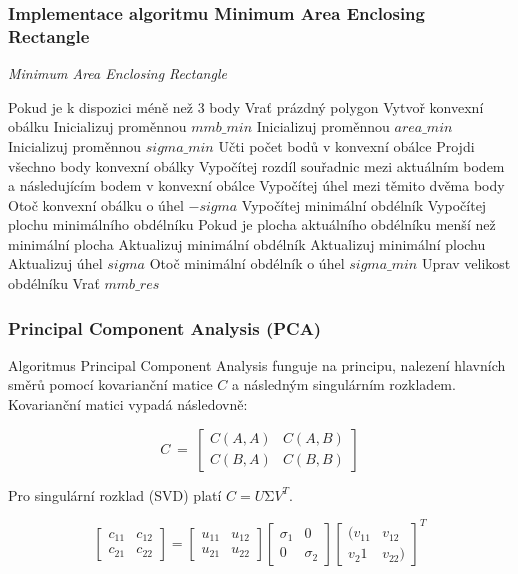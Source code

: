 \documentclass{article}
\begin{document}
\begin{spacing}{1.5}
\newpage
\subsubsection*{Implementace algoritmu Minimum Area Enclosing Rectangle}
\begin{algorithm}[h]
    \caption {\textit{Minimum Area Enclosing Rectangle}}
    \begin{algorithmic}[1]
        \State Pokud je k dispozici méně než 3 body
        \State \indent Vrať prázdný polygon
        \State Vytvoř konvexní obálku
        \State Inicializuj proměnnou $mmb\_min$ 
        \State Inicializuj proměnnou $area\_min$
        \State Inicializuj proměnnou $sigma\_min$
        \State Učti počet bodů v konvexní obálce
        \State Projdi všechno body konvexní obálky
        \State \indent Vypočítej rozdíl souřadnic mezi aktuálním bodem a následujícím bodem v konvexní obálce
        \State \indent Vypočítej úhel mezi těmito dvěma body
        \State \indent Otoč konvexní obálku o úhel $-sigma$
        \State \indent Vypočítej minimální obdélník
        \State \indent Vypočítej plochu minimálního obdélníku
        \State \indent Pokud je plocha aktuálního obdélníku menší než minimální plocha
        \State \indent \indent Aktualizuj minimální obdélník
        \State \indent \indent Aktualizuj minimální plochu  
        \State \indent \indent Aktualizuj úhel $sigma$	
        \State Otoč minimální obdélník o úhel $sigma\_min$
        \State  Uprav velikost obdélníku 
        \State Vrať $mmb\_res$
    \end{algorithmic}
\end{algorithm}

\subsubsection{Principal Component Analysis (PCA)}
Algoritmus Principal Component Analysis funguje na principu, nalezení hlavních směrů pomocí kovarianční matice $C$ a následným singulárním rozkladem. Kovarianční matici vypadá následovně:

$$C\ =\ \begin{bmatrix}
        C(A, A)&C(A, B)\\
        C(B, A)&C(B,B)
        \end{bmatrix}$$

Pro singulární rozklad (SVD) platí $C = U\mathrm{\Sigma}V^T$.

$$\begin{bmatrix}
c_{11}&c_{12}\\c_{21}&c_{22}
\end{bmatrix}
= 
\begin{bmatrix}
u_{11}&u_{12}\\u_{21}&u_{22}
\end{bmatrix}
\begin{bmatrix}
\sigma_1&0\\0&\sigma_2
\end{bmatrix}
\begin{bmatrix}
(v_{11}&v_{12}\\v_{2}1&v_{22})
\end{bmatrix}^T$$



\end{spacing}
\end{document}
